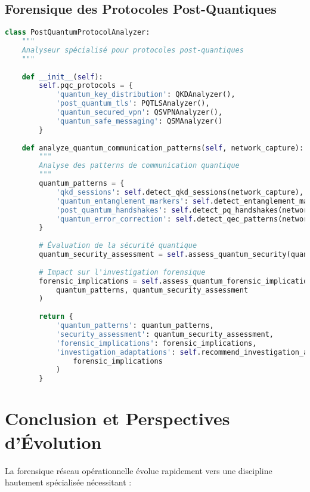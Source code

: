 \subsection{Forensique des Protocoles Post-Quantiques}

\begin{lstlisting}[language=Python, caption=Analyseur de protocoles post-quantiques]
class PostQuantumProtocolAnalyzer:
    """
    Analyseur spécialisé pour protocoles post-quantiques
    """
    
    def __init__(self):
        self.pqc_protocols = {
            'quantum_key_distribution': QKDAnalyzer(),
            'post_quantum_tls': PQTLSAnalyzer(),
            'quantum_secured_vpn': QSVPNAnalyzer(),
            'quantum_safe_messaging': QSMAnalyzer()
        }
        
    def analyze_quantum_communication_patterns(self, network_capture):
        """
        Analyse des patterns de communication quantique
        """
        quantum_patterns = {
            'qkd_sessions': self.detect_qkd_sessions(network_capture),
            'quantum_entanglement_markers': self.detect_entanglement_markers(network_capture),
            'post_quantum_handshakes': self.detect_pq_handshakes(network_capture),
            'quantum_error_correction': self.detect_qec_patterns(network_capture)
        }
        
        # Évaluation de la sécurité quantique
        quantum_security_assessment = self.assess_quantum_security(quantum_patterns)
        
        # Impact sur l'investigation forensique
        forensic_implications = self.assess_quantum_forensic_implications(
            quantum_patterns, quantum_security_assessment
        )
        
        return {
            'quantum_patterns': quantum_patterns,
            'security_assessment': quantum_security_assessment,
            'forensic_implications': forensic_implications,
            'investigation_adaptations': self.recommend_investigation_adaptations(
                forensic_implications
            )
        }
\end{lstlisting}

\section{Conclusion et Perspectives d'Évolution}

La forensique réseau opérationnelle évolue rapidement vers une discipline hautement spécialisée nécessitant :

